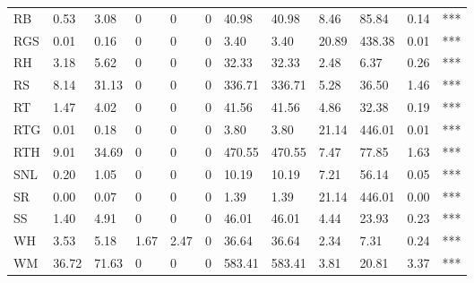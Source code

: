 \begin{table}[]
\begin{tabular}{llllllllllll}
RB   & 0.53   & 3.08   & 0      & 0     & 0   & 40.98   & 40.98   & 8.46  & 85.84    & 0.14  & ***              \\
RGS  & 0.01   & 0.16   & 0      & 0     & 0   & 3.40    & 3.40    & 20.89 & 438.38   & 0.01  & ***              \\
RH   & 3.18   & 5.62   & 0      & 0     & 0   & 32.33   & 32.33   & 2.48  & 6.37     & 0.26  & ***              \\
RS   & 8.14   & 31.13  & 0      & 0     & 0   & 336.71  & 336.71  & 5.28  & 36.50    & 1.46  & ***              \\
RT   & 1.47   & 4.02   & 0      & 0     & 0   & 41.56   & 41.56   & 4.86  & 32.38    & 0.19  & ***              \\
RTG  & 0.01   & 0.18   & 0      & 0     & 0   & 3.80    & 3.80    & 21.14 & 446.01   & 0.01  & ***              \\
RTH  & 9.01   & 34.69  & 0      & 0     & 0   & 470.55  & 470.55  & 7.47  & 77.85    & 1.63  & ***              \\
SNL  & 0.20   & 1.05   & 0      & 0     & 0   & 10.19   & 10.19   & 7.21  & 56.14    & 0.05  & ***              \\
SR   & 0.00   & 0.07   & 0      & 0     & 0   & 1.39    & 1.39    & 21.14 & 446.01   & 0.00  & ***              \\
SS   & 1.40   & 4.91   & 0      & 0     & 0   & 46.01   & 46.01   & 4.44  & 23.93    & 0.23  & ***              \\
WH   & 3.53   & 5.18   & 1.67   & 2.47  & 0   & 36.64   & 36.64   & 2.34  & 7.31     & 0.24  & ***              \\
WM   & 36.72  & 71.63  & 0      & 0     & 0   & 583.41  & 583.41  & 3.81  & 20.81    & 3.37  & ***             
\end{tabular}
\end{table}